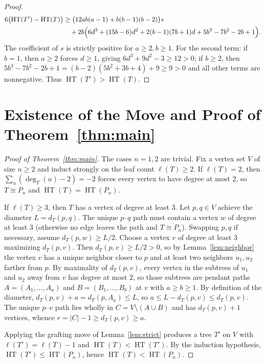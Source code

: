 \documentclass[11pt]{article}
\newcommand{\HT}{\operatorname{HT}}
\begin{document}
\begin{proof}
\begin{align*}
  6\bigl(\HT(T') - \HT(T)\bigr) &\ge \bigl(12ab(a - 1) + b(b - 1)(b - 2)\bigr) s \\
  &\quad + 2b\Bigl(6d^3 + (15b - 6)d^2 + 2(b - 1)(7b + 1)d + 5b^3 - 7b^2 - 2b + 1\Bigr).
\end{align*}
The coefficient of $s$ is strictly positive for $a \ge 2, b \ge 1$. For the second term: if $b = 1$, then $a \ge 2$ forces $d \ge 1$, giving $6d^3 + 9d^2 - 3 \ge 12 > 0$; if $b \ge 2$, then $5b^3 - 7b^2 - 2b + 1 = (b - 2)(5b^2 + 3b + 4) + 9 \ge 9 > 0$ and all other terms are nonnegative. Thus $\HT(T') > \HT(T)$.
\end{proof}

\section{Existence of the Move and Proof of Theorem~\ref{thm:main}}

\begin{proof}[Proof of Theorem~\ref{thm:main}]
The cases $n = 1, 2$ are trivial. Fix a vertex set $V$ of size $n \ge 2$ and induct strongly on the leaf count $\ell(T) \ge 2$. If $\ell(T) = 2$, then $\sum_u (\deg_T(u) - 2) = -2$ forces every vertex to have degree at most $2$, so $T \cong P_n$ and $\HT(T) = \HT(P_n)$.

If $\ell(T) \ge 3$, then $T$ has a vertex of degree at least $3$. Let $p, q \in V$ achieve the diameter $L = d_T(p, q)$. The unique $p$--$q$ path must contain a vertex $w$ of degree at least $3$ (otherwise no edge leaves the path and $T \cong P_n$). Swapping $p, q$ if necessary, assume $d_T(p, w) \ge L / 2$. Choose a vertex $v$ of degree at least $3$ maximizing $d_T(p, v)$. Then $d_T(p, v) \ge L / 2 > 0$, so by Lemma~\ref{lem:neighbor} the vertex $v$ has a unique neighbor closer to $p$ and at least two neighbors $u_1, u_2$ farther from $p$. By maximality of $d_T(p, v)$, every vertex in the subtrees of $u_1$ and $u_2$ away from $v$ has degree at most $2$, so those subtrees are pendant paths $A = (A_1, \dots, A_a)$ and $B = (B_1, \dots, B_b)$ at $v$ with $a \ge b \ge 1$. By definition of the diameter, $d_T(p, v) + a = d_T(p, A_a) \le L$, so $a \le L - d_T(p, v) \le d_T(p, v)$. The unique $p$--$v$ path lies wholly in $C = V \setminus (A \cup B)$ and has $d_T(p, v) + 1$ vertices, whence $r = |C| - 1 \ge d_T(p, v) \ge a$.

Applying the grafting move of Lemma~\ref{lem:strict} produces a tree $T'$ on $V$ with $\ell(T') = \ell(T) - 1$ and $\HT(T) < \HT(T')$. By the induction hypothesis, $\HT(T') \le \HT(P_n)$, hence $\HT(T) < \HT(P_n)$.
\end{proof}
\end{document}
